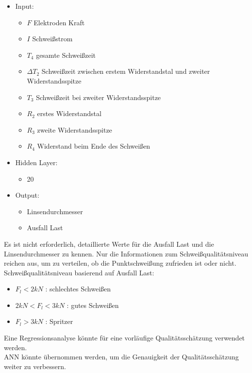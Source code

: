 \documentclass[english,ngerman]{tudscrreprt}
\begin{document}
\begin{itemize}
\item Input:
\begin{itemize}
	\item $F$ Elektroden Kraft
	\item $I$ Schweißstrom  
	\item $T_{4}$ gesamte Schweißzeit
	\item $\Delta T_{2}$ Schweißzeit zwischen erstem Widerstandstal und zweiter Widerstandsspitze
	\item $T_{3}$ Schweißzeit bei zweiter Widerstandsspitze
	\item $R_{2}$ erstes Widerstandstal
	\item $R_{3}$ zweite Widerstandsspitze
	\item $R_{4}$ Widerstand beim Ende des Schweißen
\end{itemize}
\item Hidden Layer:
\begin{itemize}
	\item 20
\end{itemize}
\item Output:
\begin{itemize}
	\item Linsendurchmesser
	\item Ausfall Last
\end{itemize}
\end{itemize}
Es ist nicht erforderlich, detaillierte Werte für die Ausfall Last und die Linsendurchmesser zu kennen. Nur die Informationen zum Schweißqualitätsniveau reichen aus, um zu verteilen, ob die Punktschweißung zufrieden ist oder nicht.\\
Schweißqualitätsniveau basierend auf Ausfall Last:
\begin{itemize}
	\item $F_{l}<2kN$ : schlechtes Schweißen
	\item $2kN<F_{l}<3kN$ : gutes Schweißen
	\item $F_{l}>3kN$ : Spritzer
\end{itemize}
Eine Regressionsanalyse könnte für eine vorläufige Qualitätsschätzung verwendet werden.\\
ANN könnte übernommen werden, um die Genauigkeit der Qualitätsschätzung weiter zu verbessern.
\newpage




\printbibliography[heading=bibintoc]\label{sec:bibliography}%
\end{document}
